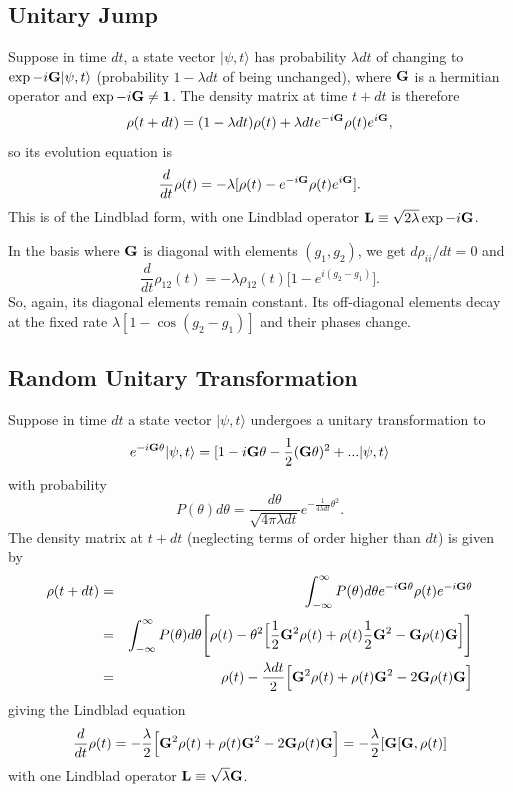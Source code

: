 \documentclass[aps,pra,amssymb, amsfonts,amsmath,showpacs, superscriptaddress,12pt]{revtex4}
\begin{document}
\subsection{Unitary Jump}

Suppose in time $dt$, a state vector $|\psi, t\rangle$ has probability $\lambda dt$ of changing to $\exp-i{\bf G}|\psi, t\rangle$ (probability $1-\lambda dt$ of being unchanged), where 
${\bf G}$ is a hermitian operator and $\exp-i{\bf G}\neq{\bf 1}$.  The density matrix at time $t+dt$ is therefore           
\[
	{\bf \rho}(t+dt)=(1-\lambda dt){\bf \rho}(t)+\lambda dte^{-i{\bf G}}{\bf \rho}(t)e^{i{\bf G}}, 
\]
\noindent so its evolution equation is  
\[
		\frac{d}{dt}{\bf \rho}(t)=-\lambda[{\bf \rho}(t)-e^{-i{\bf G}}{\bf \rho}(t)e^{i{\bf G}}].
\]
\noindent This is of the Lindblad form, with one Lindblad operator ${\bf L}\equiv  \sqrt{2\lambda}\exp{-i{\bf G}}$. 

In the basis where ${\bf G}$ is diagonal with elements $(g_{1},g_{2})$, we get 
$d\rho_{ii}/dt=0$ and
\[
\frac{d}{dt}\rho_{12}(t)=-\lambda\rho_{12}(t)\Big[1-e^{i(g_{2}-g_{1})}\Big]. 
\]
\noindent So, again, its diagonal elements remain constant.   Its off-diagonal elements  decay at the fixed rate $\lambda[1-\cos(g_{2}-g_{1})]$ 
and their phases change. 
 
\subsection{Random Unitary Transformation}
Suppose in time $dt$ a state vector $|\psi,t\rangle$ undergoes a unitary transformation to
\[ 
	e^{-i{\bf G}\theta}|\psi,t\rangle=[1-i{\bf G}\theta -\frac{1}{2}({\bf G}\theta)^{2}+ ...|\psi,t\rangle
\]
 with probability 
\[
P(\theta)d\theta = \frac{d\theta}{\sqrt{4\pi\lambda dt}}e^{-\frac{1}{4\lambda dt}\theta^{2}}. 
\] 
\noindent  The density matrix at $t+dt$ (neglecting terms of order higher than $dt$) is given by
\begin{eqnarray}
{\bf \rho}(t+dt)&=&\int_{-\infty}^{\infty}P(\theta)d\theta e^{-i{\bf G}\theta}{\bf \rho}(t)e^{-i{\bf G}\theta}\nonumber\\
&=&\int_{-\infty}^{\infty}P(\theta)d\theta\Bigg[{\bf \rho}(t)-\theta^{2}\Big[\frac{1}{2}{\bf G}^{2}{\bf \rho}(t)+{\bf \rho}(t)\frac{1}{2}{\bf G}^{2}-{\bf G}{\bf \rho}(t){\bf G}\Big]\Bigg]\nonumber\\
&=&{\bf \rho}(t)-\frac{\lambda dt}{2}\Big[{\bf G}^{2}{\bf \rho}(t)+{\bf \rho}(t){\bf G}^{2}-2{\bf G}{\bf \rho}(t){\bf G}\Big]\nonumber
\end{eqnarray}
\noindent giving the Lindblad equation
\[
\frac{d}{dt}{\bf \rho}(t)=-\frac{\lambda}{2}\Big[{\bf G}^{2}{\bf \rho}(t)+{\bf \rho}(t){\bf G}^{2}-2{\bf G}{\bf \rho}(t){\bf G}\Big]=-\frac{\lambda}{2}[{\bf G}[{\bf G}, {\bf \rho}(t) ]
\]
\noindent with one Lindblad operator ${\bf L}\equiv \sqrt{\lambda} {\bf G}$.
\end{document}
